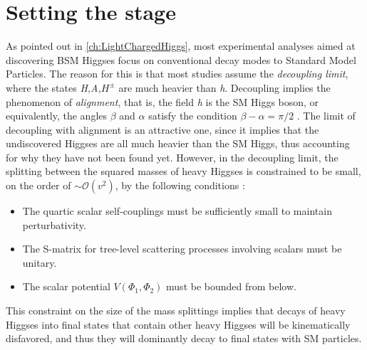 \section{Setting the stage}
As pointed out in \autoref{ch:LightChargedHiggs}, most experimental analyses aimed at discovering BSM Higgses focus on conventional decay modes to Standard Model Particles. The reason for this is that most studies assume the \emph{decoupling limit}, where the states \emph{H,A,$H^\pm$} are much heavier than \emph{h}. Decoupling implies the phenomenon of \emph{alignment}, that is, the field \emph{h} is the SM Higgs boson, or equivalently, the angles $\beta$ and $\alpha$ satisfy the condition $\beta-\alpha = \pi/2$ \cite{Contino:2016spe}. The limit of decoupling with alignment is an attractive one, since it implies that the undiscovered Higgses are all much heavier than the SM Higgs, thus accounting for why they have not been found yet. However, in the decoupling limit, the splitting between the squared masses of heavy Higgses is constrained to be small, on the order of $\sim\mathcal{O}(v^2)$, by the following conditions \cite{Gunion:2002zf}:
\begin{itemize}
\item The quartic scalar self-couplings must be sufficiently small to maintain perturbativity.
\item The S-matrix for tree-level scattering processes involving scalars must be unitary.
\item The scalar potential $V(\Phi_1,\Phi_2)$ must be bounded from below. 
\end{itemize}
This constraint on the size of the mass splittings implies that decays of heavy Higgses into final states that contain other heavy Higgses will be kinematically disfavored, and thus they will dominantly decay to final states with SM particles.

